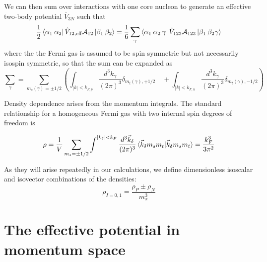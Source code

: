 \documentclass[%
 preprint,
 amsmath,amssymb,
 aps,
]{revtex4-1}
\begin{document}
We can then sum over interactions with one core nucleon to generate an effective two-body potential $\overline{V}_{3N}$ such that
\begin{equation}
\frac{1}{2} \bra{\alpha_1\:\alpha_2} \hat{V}_{12,\text{eff}} \mathcal{A}_{12}\ket{\beta_1 \:\beta_2 }=\frac{1}{6} \sum_{\gamma} \bra{\alpha_1\:\alpha_2 \: \gamma} \hat{V}_{123} \mathcal{A}_{123} \ket{\beta_1 \:\beta_2 \gamma}
\end{equation}
where the the Fermi gas is assumed to be spin symmetric but not necessarily isospin symmetric, so that the sum can be expanded as
\begin{equation}
\sum_\gamma=\sum_{m_s(\gamma)=\pm 1/2}\left(\int_{|k|<k_{F,p}} \frac{d^3k_\gamma}{(2\pi)^3} \delta_{m_{t}(\gamma),+1/2} \quad+\int_{|k|<k_{F,n}} \frac{d^3k_\gamma}{(2\pi)^3} \delta_{m_{t}(\gamma),-1/2}\right)
\end{equation}

Density dependence arises from the momentum integrals. The standard relationship for a homogeneous Fermi gas with two internal spin degrees of freedom is 

\begin{equation}\label{eq:kF}
\rho=\frac{1}{V}\sum_{m_{s}=\pm 1/2}\int^{|k_\delta|<k_F}\frac{d^3\vec{k}_\delta}{(2\pi)^3}\braket{\vec{k}_\delta m_s m_t | \vec{k}_\delta m_s m_t}=\frac{k_F^3}{3\pi^2}
\end{equation}

As they will arise repeatedly in our calculations, we define dimensionless isoscalar and isovector combinations of the densities:
\begin{equation}\label{eq:densities}
\rho_{I=0,1}=\frac{\rho_P\pm\rho_N}{m_\pi^3}
\end{equation}

\section{\label{sec:momentum} The effective potential in momentum space}
\end{document}
